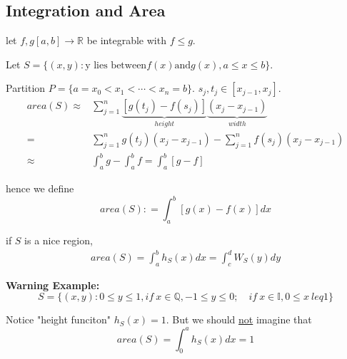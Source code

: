 \documentclass[12pt]{article}
\theoremstyle{plain}
\newcommand{\mQ}{{\mathbb{Q}}}
\newcommand{\mI}{{\mathbb{I}}}
\newcommand{\mR}{{\mathbb{R}}}
\begin{document}
\newpage
\subsection{Integration and Area}

let $f,g [a,b] \to \mR$ be integrable with $f\leq g$. 

Let $S = \{(x,y): \text{y lies between} f(x) \text{and} g(x), a\leq x\leq b
\}$.

Partition $P=\{a=x_0<x_1<\cdots<x_n = b\}$. $s_j, t_j \in [x_{j-1},x_j]$. 
\begin{align*}
	area(S) \approx& \sum_{j=1}^n \underbrace{[g(t_j) - f(s_j)]}_{height}
	\underbrace{(x_j-x_{j-1})}_{width}\\
	=&\sum_{j=1}^n g(t_j) (x_j-x_{j-1}) - \sum_{j=1}^n f(s_j)(x_j-x_{j-1})\\
	\approx& \int_a^b g - \int_a^b f = \int_a^b [g-f] 
	\tag{Say $l(P) < \delta$, by A2Q1}
\end{align*}

hence we define 
\[
	area (S) : = \int_a^b [g(x) - f(x)] dx
\]

if $S$ is a nice region, 
\begin{align*}
	area (S) = \int_a^b h_S(x) dx
	= \int_c^d W_S(y)dy
\end{align*}

{\color{Brown}
\textbf{Warning Example: }
\[
	S = \{(x,y) : 0\leq y \leq 1, if \ x \in \mQ, -1 \leq y \leq 0; \quad
	if \ x\in \mI, 0\leq x\ leq 1\} 
\]

Notice "height funciton" $h_S(x) = 1$. But we should \underline{not} 
imagine that 
\[
	area(S) = \int_0^a h_S(x)dx = 1
\]
}
\end{document}
